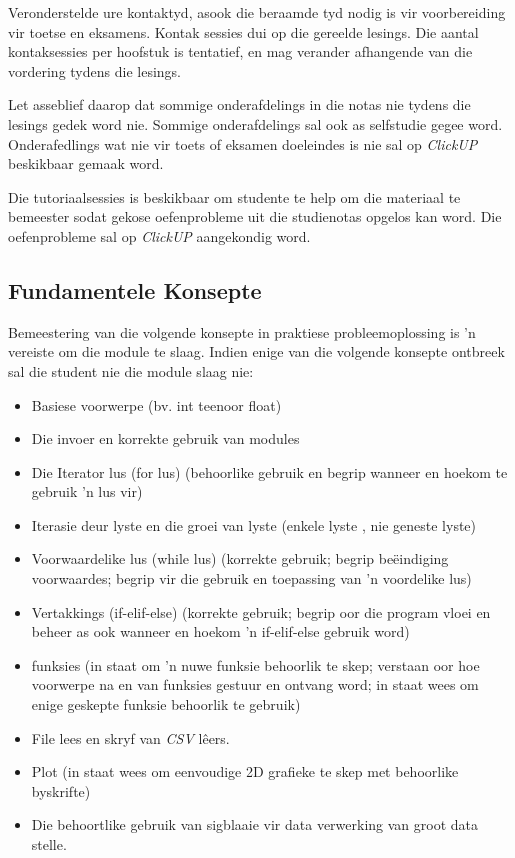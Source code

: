 	Veronderstelde ure kontaktyd, asook die beraamde tyd 
         nodig is vir voorbereiding vir toetse en eksamens. Kontak sessies dui 
         op die gereelde lesings. Die aantal kontaksessies per hoofstuk is 
         tentatief, en mag verander afhangende van die vordering tydens die lesings.

	Let asseblief daarop dat sommige onderafdelings in die notas nie tydens die lesings
	gedek word nie. Sommige onderafdelings sal ook as selfstudie gegee word.
 	Onderafedlings wat nie vir toets of eksamen doeleindes is nie sal op \textit{ClickUP} beskikbaar 
	gemaak word.

	Die tutoriaalsessies is beskikbaar om studente te help om die materiaal te bemeester sodat 
	gekose oefenprobleme uit die studienotas opgelos kan word. Die oefenprobleme sal op 	   
     	\textit{ClickUP} aangekondig word.	
        
	\subsection{Fundamentele Konsepte}
	Bemeestering van die volgende konsepte in praktiese probleemoplossing is 'n vereiste om die
  	module te slaag. Indien enige
	van die volgende konsepte ontbreek sal die student nie die module slaag nie:

        \begin{itemize}
	\item Basiese voorwerpe (bv. int teenoor float)
            \item Die invoer en korrekte gebruik van modules
            \item Die Iterator lus (for  lus) (behoorlike gebruik en begrip wanneer en hoekom te gebruik
                'n lus vir)
            \item Iterasie deur lyste en die groei van lyste (enkele lyste , nie
                geneste lyste)
            \item Voorwaardelike lus (while lus) (korrekte gebruik; begrip be\"eindiging
                voorwaardes; begrip vir die gebruik en toepassing van 'n voordelike lus)
            \item Vertakkings (if-elif-else) (korrekte gebruik; begrip oor die program vloei en
                beheer as ook wanneer en hoekom 'n if-elif-else gebruik word)
            \item funksies (in staat om 'n nuwe funksie behoorlik te skep; verstaan oor
                hoe voorwerpe na en van funksies gestuur en ontvang word; in staat wees om enige
                geskepte funksie behoorlik te gebruik)
            \item File lees en skryf van \emph{CSV} lêers.
            \item Plot (in staat wees om eenvoudige 2D grafieke te skep met behoorlike
                byskrifte)
            \item Die behoortlike gebruik van sigblaaie vir data verwerking van groot data stelle.
        \end{itemize}
    
